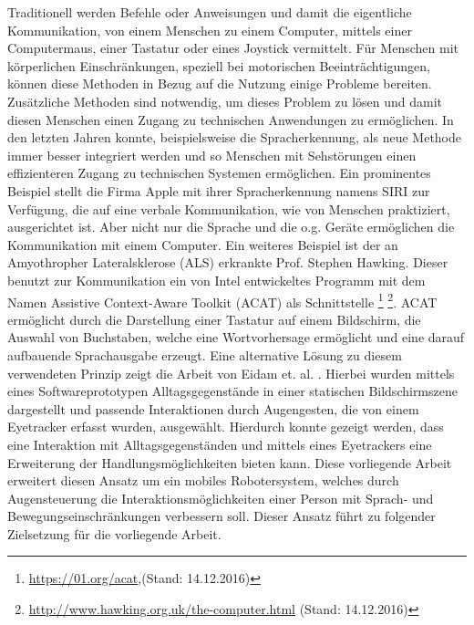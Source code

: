 Traditionell werden Befehle oder Anweisungen und damit die eigentliche Kommunikation, von einem Menschen zu einem Computer, mittels einer Computermaus, einer Tastatur oder eines Joystick vermittelt. Für Menschen mit körperlichen Einschränkungen, speziell bei motorischen Beeinträchtigungen, können diese Methoden in Bezug auf die Nutzung einige Probleme bereiten. Zusätzliche Methoden sind notwendig, um dieses Problem zu lösen und damit diesen Menschen einen Zugang zu technischen Anwendungen zu ermöglichen. In den letzten Jahren konnte, beispielsweise die Spracherkennung, als neue Methode immer besser integriert werden und so Menschen mit Sehstörungen einen effizienteren Zugang zu technischen Systemen ermöglichen.
Ein prominentes Beispiel stellt die Firma Apple mit ihrer Spracherkennung namens SIRI zur Verfügung, die auf eine verbale Kommunikation, wie von Menschen praktiziert, ausgerichtet ist. Aber nicht nur die Sprache und die o.g. Geräte ermöglichen die Kommunikation mit einem Computer. Ein weiteres Beispiel ist der an Amyothropher Lateralsklerose (ALS) erkrankte Prof. Stephen Hawking. Dieser benutzt zur Kommunikation ein von Intel entwickeltes Programm mit dem Namen Assistive Context-Aware Toolkit (ACAT) als Schnittstelle \footnote{\url{https://01.org/acat},(Stand: 14.12.2016)} 
\footnote{\url{http://www.hawking.org.uk/the-computer.html} (Stand: 14.12.2016)}. ACAT ermöglicht durch die Darstellung einer Tastatur auf einem Bildschirm, die Auswahl von Buchstaben, welche eine Wortvorhersage ermöglicht und eine darauf aufbauende Sprachausgabe erzeugt. Eine alternative Lösung zu diesem verwendeten Prinzip zeigt die Arbeit von Eidam et. al. \vgl \cite{Eidam2016}. Hierbei wurden mittels eines Softwareprototypen Alltagsgegenstände in einer statischen Bildschirmszene dargestellt und passende Interaktionen durch Augengesten, die von einem Eyetracker erfasst wurden, ausgewählt. Hierdurch konnte gezeigt werden, dass eine Interaktion mit Alltagsgegenständen und mittels eines Eyetrackers eine Erweiterung der Handlungsmöglichkeiten bieten kann. Diese vorliegende Arbeit erweitert diesen Ansatz um ein mobiles Robotersystem, welches durch Augensteuerung die Interaktionsmöglichkeiten einer Person mit Sprach- und Bewegungseinschränkungen verbessern soll. Dieser Ansatz führt zu folgender Zielsetzung für die vorliegende Arbeit. 



